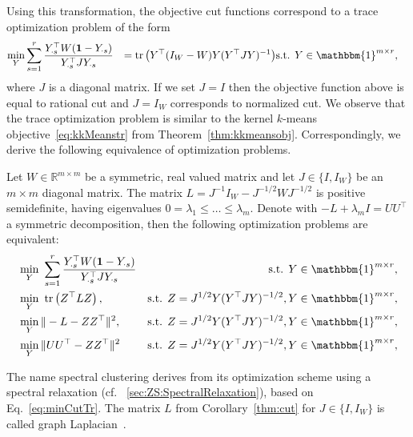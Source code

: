 Using this transformation, the objective cut functions correspond to a trace optimization problem of the form
\begin{align*}
\min_Y &\sum_{s=1}^r\frac{Y_{\cdot s}^\top W (\mathbf{1}-Y_{\cdot s})}{Y_{\cdot s}^\top J Y_{\cdot s}} 
&= \tr\left(Y^\top (I_{W}-W)Y (Y^\top JY)^{-1}\right) &\text{s.t. }Y\in\mathbbm{1}^{m\times r},
\end{align*}
where $J$ is a diagonal matrix. If we set $J=I$ then the objective function above is equal to rational cut and $J=I_W$ corresponds to normalized cut.
We observe that the trace optimization problem is similar to the kernel $k$-means objective~\eqref{eq:kkMeanstr} from Theorem~\ref{thm:kkmeansobj}. Correspondingly, we derive the following equivalence of optimization problems.
\begin{corollary}\label{thm:cut}
Let $W\in\mathbb{R}^{m\times m}$ be a symmetric, real valued matrix and let $J\in\{I,I_W\}$ be an $m\times m$ diagonal matrix. The matrix 
$L=J^{-1}I_W-J^{-1/2}WJ^{-1/2}$
is positive semidefinite, having eigenvalues $0=\lambda_1\leq\ldots\leq \lambda_m$. Denote with $-L+\lambda_mI=UU^\top$ a symmetric decomposition, then the following optimization problems are equivalent: 
\begin{align}
&\min_Y\ \sum_{s=1}^r\frac{Y_{\cdot s}^\top W (\mathbf{1}-Y_{\cdot s})}{Y_{\cdot s}^\top J Y_{\cdot s}} & \text{s.t. } Y\in\mathbbm{1}^{m\times r},\\
&\min_Y\ \tr\left(Z^\top LZ\right), & \text{s.t. } Z=J^{1/2}Y(Y^\top JY)^{-1/2}, Y\in\mathbbm{1}^{m\times r},\label{eq:minCutTr}\\ 
&\min_Y \|-L-ZZ^\top\|^2, & \text{s.t. } Z=J^{1/2}Y(Y^\top JY)^{-1/2}, Y\in\mathbbm{1}^{m\times r}, \label{eq:minCutNorm} \\
&\min_Y \|UU^\top-ZZ^\top\|^2 & \text{s.t. } Z=J^{1/2}Y(Y^\top JY)^{-1/2}, Y\in\mathbbm{1}^{m\times r}, \label{eq:minCutU}
\end{align}
\end{corollary}
The name spectral clustering derives from its optimization scheme using a spectral relaxation (cf. \@Section~\ref{sec:ZS:SpectralRelaxation}), based on Eq.~\eqref{eq:minCutTr}.
The matrix $L$ from Corollary~\ref{thm:cut} for $J\in\{I,I_W\}$ is called graph Laplacian~\citep{mohar1991laplacian,chung1997spectral}. 
